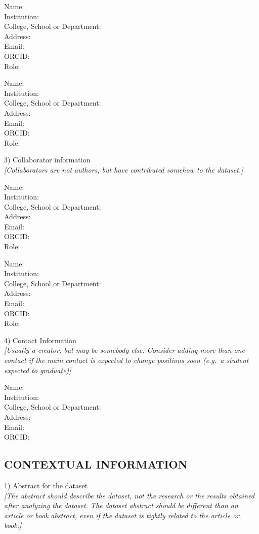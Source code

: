 \documentclass[]{article}
\begin{document}
Name:\\
Institution:\\
College, School or Department:\\
Address:\\
Email:\\
ORCID:\\
Role:

Name:\\
Institution:\\
College, School or Department:\\
Address:\\
Email:\\
ORCID:\\
Role:

3) Collaborator information\\
\emph{{[}Collaborators are not authors, but have contributed somehow to
the dataset.{]}}

Name:\\
Institution:\\
College, School or Department:\\
Address:\\
Email:\\
ORCID:\\
Role:

Name:\\
Institution:\\
College, School or Department:\\
Address:\\
Email:\\
ORCID:\\
Role:

4) Contact Information\\
\emph{{[}Usually a creator, but may be somebody else. Consider adding
more than one contact if the main contact is expected to change
positions soon (e.g.~a student expected to graduate){]}}

Name:\\
Institution:\\
College, School or Department:\\
Address:\\
Email:\\
ORCID:

\subsection{CONTEXTUAL INFORMATION}\label{contextual-information}

1) Abstract for the dataset\\
\emph{{[}The abstract should describe the dataset, not the research or
the results obtained after analyzing the dataset. The dataset abstract
should be different than an article or book abstract, even if the
dataset is tightly related to the article or book.{]}}
\end{document}
